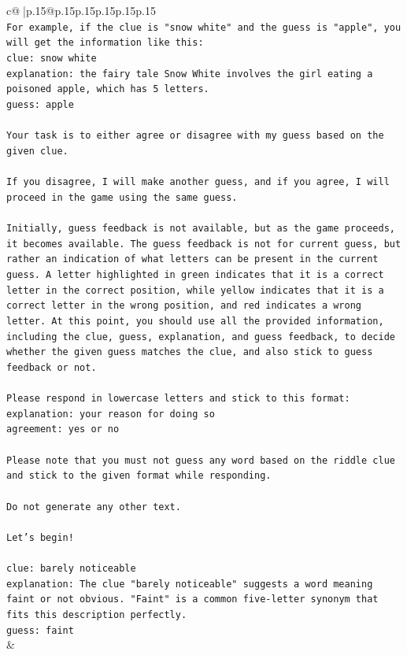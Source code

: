\documentclass{article}
\begin{document}
{\begin{supertabular}{c@{$\;$}|p{.15\linewidth}@{}p{.15\linewidth}p{.15\linewidth}p{.15\linewidth}p{.15\linewidth}p{.15\linewidth}}
{{{\\ 
\texttt{For example, if the clue is "snow white" and the guess is "apple", you will get the information like this:} \\
\texttt{clue: snow white} \\
\texttt{explanation: the fairy tale Snow White involves the girl eating a poisoned apple, which has 5 letters.} \\
\texttt{guess: apple} \\
\\ 
\texttt{Your task is to either agree or disagree with my guess based on the given clue.} \\
\\ 
\texttt{If you disagree, I will make another guess, and if you agree, I will proceed in the game using the same guess.} \\
\\ 
\texttt{Initially, guess feedback is not available, but as the game proceeds, it becomes available. The guess feedback is not for current guess, but rather an indication of what letters can be present in the current guess. A letter highlighted in green indicates that it is a correct letter in the correct position, while yellow indicates that it is a correct letter in the wrong position, and red indicates a wrong letter. At this point, you should use all the provided information, including the clue, guess, explanation, and guess feedback, to decide whether the given guess matches the clue, and also stick to guess feedback or not.} \\
\\ 
\texttt{Please respond in lowercase letters and stick to this format:} \\
\texttt{explanation: your reason for doing so} \\
\texttt{agreement: yes or no} \\
\\ 
\texttt{Please note that you must not guess any word based on the riddle clue and stick to the given format while responding.} \\
\\ 
\texttt{Do not generate any other text.} \\
\\ 
\texttt{Let's begin!} \\
\\ 
\texttt{clue: barely noticeable} \\
\texttt{explanation: The clue "barely noticeable" suggests a word meaning faint or not obvious. "Faint" is a common five{-}letter synonym that fits this description perfectly.} \\
\texttt{guess: faint} \\
            }
        }
    }
    & \\ \\


\end{supertabular}}
\end{document}
